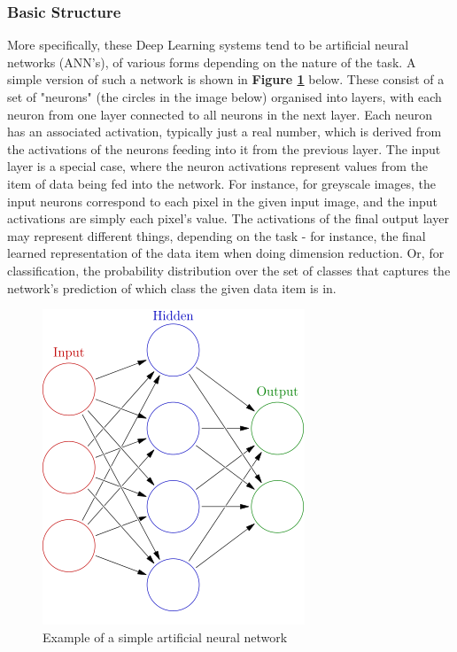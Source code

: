 \documentclass[11pt]{article} %
\theoremstyle{plain}
\theoremstyle{definition}
\begin{document}
\subsubsection{Basic Structure}
More specifically, these Deep Learning systems tend to be artificial neural networks (ANN's), of various forms depending on the nature of the task. A simple version of such a network \cite{wiki:simple_ann} is shown in \textbf{Figure \ref{fig:simple_ann}} below. These consist of a set of "neurons" (the circles in the image below) organised into layers, with each neuron from one layer connected to all neurons in the next layer. Each neuron has an associated activation, typically just a real number, which is derived from the activations of the neurons feeding into it from the previous layer. The input layer is a special case, where the neuron activations represent values from the item of data being fed into the network. For instance, for greyscale images, the input neurons correspond to each pixel in the given input image, and the input activations are simply each pixel's value. The activations of the final output layer may represent different things, depending on the task - for instance, the final learned representation of the data item when doing dimension reduction. Or, for classification, the probability distribution over the set of classes that captures the network's prediction of which class the given data item is in. 
\begin{figure}[!ht]
  \centering    
  \caption{Example of a simple artificial neural network}
  \label{fig:simple_ann}
  \includegraphics[scale=0.5]{simple_ann.png}
\end{figure}
\\
\end{document}

